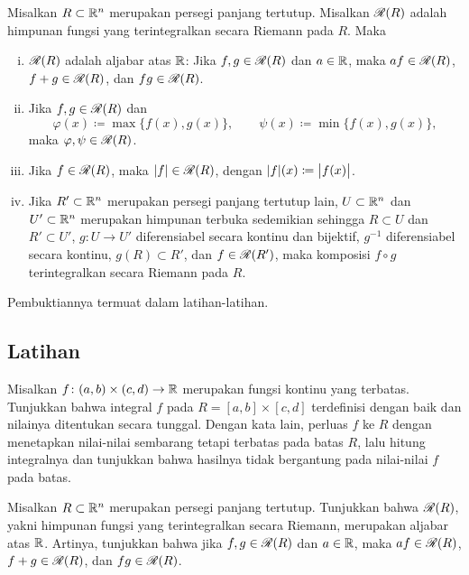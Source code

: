 \begin{cor} \label{cor:closednessofriemannintegrable}
\pagebreak[2]
Misalkan $R \subset {\mathbb{R}}^n$ merupakan persegi panjang tertutup.  Misalkan
${\mathscr{R}}(R)$ adalah himpunan fungsi yang terintegralkan secara Riemann pada $R$.
Maka
\begin{enumerate}[(i)]
\item
${\mathscr{R}}(R)$ adalah aljabar atas ${\mathbb{R}}$:
Jika $f,g \in {\mathscr{R}}(R)$ dan $a \in {\mathbb{R}}$, maka $af \in {\mathscr{R}}(R)$,
$f+g \in {\mathscr{R}}(R)$, dan $fg \in {\mathscr{R}}(R)$.
\item
Jika $f,g \in {\mathscr{R}}(R)$ dan
\begin{equation*}
\varphi(x) \coloneqq \max \bigl\{ f(x) , g(x) \bigr\} ,
\qquad
\psi(x) \coloneqq \min \bigl\{ f(x) , g(x) \bigr\} ,
\end{equation*}
maka $\varphi, \psi \in {\mathscr{R}}(R)$.
\item
Jika $f \in {\mathscr{R}}(R)$, maka $\lvert {f} \rvert \in {\mathscr{R}}(R)$, dengan
$\lvert {f} \rvert(x) \coloneqq \bigl\lvert {f(x)} \bigr\rvert$.
\item
Jika $R' \subset {\mathbb{R}}^n$ merupakan persegi panjang tertutup lain,
$U \subset {\mathbb{R}}^n$ dan $U' \subset {\mathbb{R}}^n$ merupakan himpunan terbuka sedemikian
sehingga $R \subset U$ dan $R' \subset U'$,
$g \colon U \to U'$ diferensiabel secara kontinu dan bijektif,
$g^{-1}$ diferensiabel secara kontinu,
$g(R) \subset R'$,
dan $f \in {\mathscr{R}}(R')$,
maka komposisi $f \circ g$ terintegralkan secara Riemann pada $R$.
\end{enumerate}
\end{cor}

Pembuktiannya termuat dalam latihan-latihan.

\subsection{Latihan}

\begin{exercise}
Misalkan $f \colon (a,b) \times (c,d) \to {\mathbb{R}}$ merupakan fungsi kontinu yang
terbatas. Tunjukkan bahwa integral $f$ pada $R = [a,b] \times [c,d]$
terdefinisi dengan baik dan nilainya ditentukan secara tunggal. Dengan kata
lain, perluas $f$ ke $R$ dengan menetapkan nilai-nilai sembarang tetapi terbatas
pada batas $R$, lalu hitung integralnya dan tunjukkan bahwa hasilnya tidak
bergantung pada nilai-nilai $f$ pada batas.
\end{exercise}

\begin{exercise}
Misalkan $R \subset {\mathbb{R}}^n$ merupakan persegi panjang tertutup. Tunjukkan bahwa
${\mathscr{R}}(R)$, yakni himpunan fungsi yang terintegralkan secara Riemann, merupakan
aljabar atas ${\mathbb{R}}$. Artinya, tunjukkan bahwa jika $f,g \in {\mathscr{R}}(R)$ dan
$a \in {\mathbb{R}}$, maka $af \in {\mathscr{R}}(R)$, $f+g \in {\mathscr{R}}(R)$, dan $fg \in {\mathscr{R}}(R)$.
\end{exercise}


